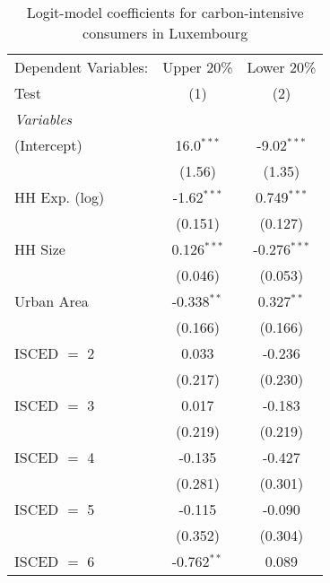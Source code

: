
\begin{table}[htbp!]
   \centering
   \small
   \begin{adjustbox}{width = 1\textwidth, max height = 0.95\textheight, center}
      \begin{threeparttable}[b]
         \caption{\label{tab:Logit_1_LUX} Logit-model coefficients for carbon-intensive consumers in Luxembourg}
         \begin{tabular}{lcc}
            \tabularnewline \midrule \midrule
            Dependent Variables: & Upper 20\%     & Lower 20\%\\   
            Test                 & (1)            & (2)\\  
            \midrule
            \emph{Variables}\\
            (Intercept)          & 16.0$^{***}$   & -9.02$^{***}$\\   
                                 & (1.56)         & (1.35)\\   
            HH Exp. (log)        & -1.62$^{***}$  & 0.749$^{***}$\\   
                                 & (0.151)        & (0.127)\\   
            HH Size              & 0.126$^{***}$  & -0.276$^{***}$\\   
                                 & (0.046)        & (0.053)\\   
            Urban Area           & -0.338$^{**}$  & 0.327$^{**}$\\   
                                 & (0.166)        & (0.166)\\   
            ISCED $=$ 2          & 0.033          & -0.236\\   
                                 & (0.217)        & (0.230)\\   
            ISCED $=$ 3          & 0.017          & -0.183\\   
                                 & (0.219)        & (0.219)\\   
            ISCED $=$ 4          & -0.135         & -0.427\\   
                                 & (0.281)        & (0.301)\\   
            ISCED $=$ 5          & -0.115         & -0.090\\   
                                 & (0.352)        & (0.304)\\   
            ISCED $=$ 6          & -0.762$^{**}$  & 0.089\\   

\end{tabular}
\end{threeparttable}
\end{adjustbox}
\end{table}
